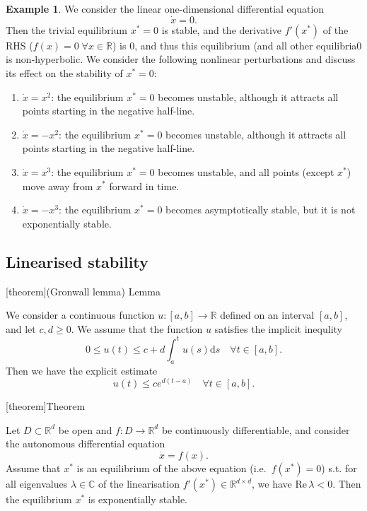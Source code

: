 \documentclass[12pt]{report}
\theoremstyle{definition}
\begin{document}
\newtheorem{1d non-hyperbolicity}[theorem]{Example}
\begin{1d non-hyperbolicity}
    We consider the linear one-dimensional differential equation
    \[
        \dot{x}=0.
    \]
    Then the trivial equilibrium $x^* =0$ is stable, and the derivative $f'(x^*)$
    of the RHS ($f(x)=0\;\forall x\in\mathbb{R}$) is 0,
    and thus this equilibrium (and all other equilibria0 is non-hyperbolic.
    We consider the following nonlinear perturbations and discuss its effect on
    the stability of $x^*=0$:
    \begin{enumerate}[label = (\roman*)]
        \item $\dot{x}=x^2$: the equilibrium $x^*=0$ becomes unstable,
            although it attracts all points starting in the negative half-line.
        \item $\dot{x}=-x^2$: the equilibrium $x^*=0$ becomes unstable,
            although it attracts all points starting in the negative half-line.
        \item $\dot{x}=x^{3}$: the equilibrium $x^*=0$ becomes unstable, and all
            points (except $x^*$) move away from $x^*$ forward in time.
        \item $\dot{x}=-x^{3}$: the equilibrium $x^*=0$ becomes asymptotically
            stable, but it is not exponentially stable.
    \end{enumerate} 
\end{1d non-hyperbolicity}

\subsection{Linearised stability}

[theorem]{(Gronwall lemma) Lemma}
\begin{gronwall lemma}
    We consider a continuous function $u:[a,b]\rightarrow\mathbb{R}$ defined on
    an interval $[a,b]$, and let $c,d\ge 0$. We assume that the function $u$
    satisfies the implicit inequlity
    \[
        0\le u(t)\le c + d \int_{a}^{t} u(s)\mathrm{d}s\quad\forall t\in[a,b].
    \]
    Then we have the explicit estimate
    \[
        u(t)\le ce^{d(t-a)}\quad\forall t\in[a,b].
    \]
\end{gronwall lemma}

[theorem]{Theorem}
\begin{linearised stability}\label{linearised stability}
    Let $D\subset \mathbb{R}^{d}$ be open and $f:D\rightarrow\mathbb{R}^{d}$
    be continuously differentiable, and consider the autonomous differential
    equation
    \[
        \dot{x}=f(x).
    \]
    Assume that $x^*$ is an equilibrium of the above equation (i.e.\ $f(x^*)=0$)
    s.t. for all eigenvalues $\lambda\in\mathbb{C}$ of the linearisation 
    $f'(x^*)\in\mathbb{R}^{d\times d}$, we have $\text{Re}\,\lambda<0$.
    Then the equilibrium $x^*$ is exponentially stable.
\end{linearised stability}
\end{document}
